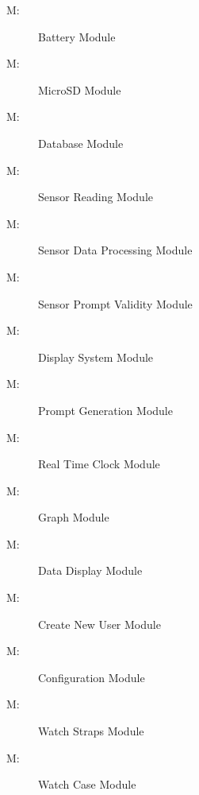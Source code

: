 \documentclass[12pt, titlepage]{article}
\newcounter{mnum}
\newcommand{\mthemnum}{M\themnum}
\begin{document}
\begin{description}
  \item [ \mthemnum \label{mBM}:] Battery Module
  \item [ \mthemnum \label{mDS_1}:] MicroSD Module
  \item [ \mthemnum \label{mDS_2}:] Database Module
  \item [ \mthemnum \label{mSA1}:] Sensor Reading Module
  \item [ \mthemnum \label{mSA2}:] Sensor Data Processing Module
  \item [ \mthemnum \label{mSA3}:] Sensor Prompt Validity Module
  \item [ \mthemnum \label{mDS_2}:] Display System Module
  \item [ \mthemnum \label{mPG}:] Prompt Generation Module
  \item [ \mthemnum \label{mRTC}:] Real Time Clock  Module
  \item [ \mthemnum \label{mGP}:] Graph  Module
  \item [ \mthemnum \label{mGP2}:] Data Display Module
  \item [ \mthemnum \label{mPS}:] Create New User Module
  \item [ \mthemnum \label{mPS2}:] Configuration Module
  \item [ \mthemnum \label{mPD}:]  Watch Straps Module
  \item [ \mthemnum \label{mPD2}:] Watch Case Module
\end{description}
\end{document}
